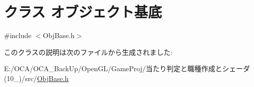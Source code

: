\hypertarget{class_xE3_x82_xAA_xE3_x83_x96_xE3_x82_xB8_xE3_x82_xA7_xE3_x82_xAF_xE3_x83_x88_xE5_x9F_xBA_xE5_xBA_x95}{\section{クラス オブジェクト基底}
\label{class_xE3_x82_xAA_xE3_x83_x96_xE3_x82_xB8_xE3_x82_xA7_xE3_x82_xAF_xE3_x83_x88_xE5_x9F_xBA_xE5_xBA_x95}
}


{\ttfamily \#include $<$Obj\-Base.\-h$>$}



このクラスの説明は次のファイルから生成されました\-:\begin{DoxyCompactItemize}
\item 
E\-:/\-O\-C\-A/\-O\-C\-A\-\_\-\-Back\-Up/\-Open\-G\-L/\-Game\-Proj/当たり判定と職種作成とシェーダ(10\-\_)/src/\hyperlink{_obj_base_8h}{Obj\-Base.\-h}\end{DoxyCompactItemize}
